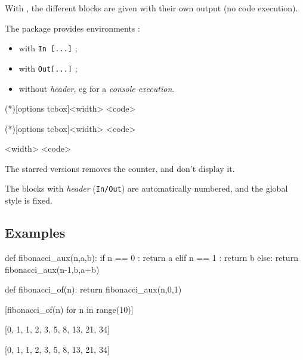 \documentclass[english,11pt,a4paper]{article}
\begin{document}
With , the different blocks are given with their own output (no code execution).

The package provides environments :

\begin{itemize}
	\item with \texttt{In~[...]} ;
	\item with \texttt{Out[...]} ;
	\item without \textit{header}, eg for a \textit{console execution}.
\end{itemize}

\begin{codehigh}[language=latex/latex2,style/main=cyan!10,style/code=cyan!10]
\begin{NotebookIn}(*)[options tcbox]{<width>}
<code>
\end{NotebookIn}
\end{codehigh}

\begin{codehigh}[language=latex/latex2,style/main=cyan!10,style/code=cyan!10]
\begin{NotebookOut}(*)[options tcbox]{<width>}
<code>
\end{NotebookOut}
\end{codehigh}

\begin{codehigh}[language=latex/latex2,style/main=cyan!10,style/code=cyan!10]
\begin{NotebookConsole}{<width>}
<code>
\end{NotebookConsole}
\end{codehigh}

The starred versions removes the counter, and don't display it.

The blocks with \textit{header} (\texttt{In/Out}) are automatically numbered, and the global style is fixed.

\subsection{Examples}

\begin{codehigh}[language=latex/latex2,style/main=cyan!10,style/code=cyan!10]
\begin{NotebookIn}{\linewidth}
def fibonacci_aux(n,a,b):
  if n == 0 :
    return a
  elif n == 1 :
    return b
  else:
    return fibonacci_aux(n-1,b,a+b)

def fibonacci_of(n):
  return fibonacci_aux(n,0,1)

[fibonacci_of(n) for n in range(10)]
\end{NotebookIn}

\begin{NotebookOut}{\linewidth}
[0, 1, 1, 2, 3, 5, 8, 13, 21, 34]
\end{NotebookOut}

\begin{NotebookConsole}{\linewidth}
[0, 1, 1, 2, 3, 5, 8, 13, 21, 34]
\end{NotebookConsole}
\end{codehigh}
\end{document}
